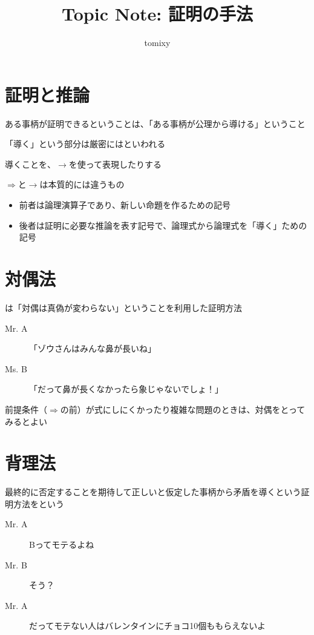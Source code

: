 \documentclass[b5paper,12pt]{jsarticle}
\title{Topic Note: 証明の手法}
\author{tomixy}
\begin{document}
\maketitle
\tableofcontents

\section{証明と推論}

ある事柄が証明できるということは、「ある事柄が公理から導ける」ということ

「導く」という部分は厳密にはといわれる

\br

導くことを、$\rightarrow $を使って表現したりする

$\Rightarrow$と$\rightarrow$は本質的には違うもの

\begin{itemize}
  \item 前者は論理演算子であり、新しい命題を作るための記号
  \item 後者は証明に必要な推論を表す記号で、論理式から論理式を「導く」ための記号
\end{itemize}

\sectionline
\section{対偶法}

は「対偶は真偽が変わらない」ということを利用した証明方法

\begin{description}
  \item[Mr. A] 「ゾウさんはみんな鼻が長いね」
  \item[Ms. B] 「だって鼻が長くなかったら象じゃないでしょ！」
\end{description}

前提条件（$\Rightarrow$の前）が式にしにくかったり複雑な問題のときは、対偶をとってみるとよい

\sectionline
\section{背理法}

最終的に否定することを期待して正しいと仮定した事柄から矛盾を導くという証明方法をという

\begin{description}
  \item[Mr. A] Bってモテるよね
  \item[Mr. B] そう？
  \item[Mr. A] だってモテない人はバレンタインにチョコ10個ももらえないよ
\end{description}
\end{document}
